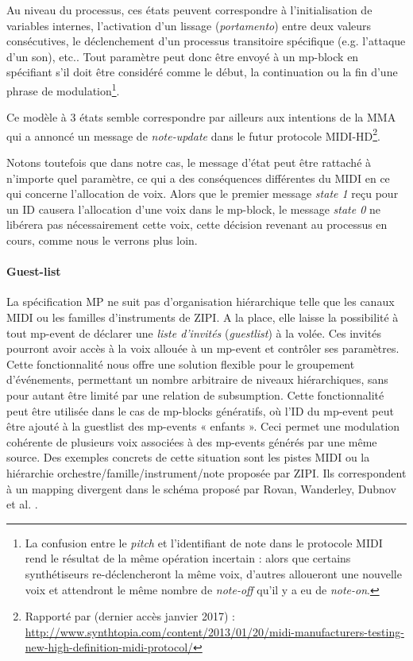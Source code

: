 Au niveau du processus, ces états peuvent correspondre à l'initialisation de variables internes, l'activation d'un lissage (\textit{portamento}) entre deux valeurs consécutives, le déclenchement d'un processus transitoire spécifique (e.g. l'attaque d'un son), etc.. Tout paramètre peut donc être envoyé à un mp-block en spécifiant s'il doit être considéré comme le début, la continuation ou la fin d'une phrase de modulation\footnote{ La confusion entre le \textit{pitch} et l'identifiant de note dans le protocole \gls{MIDI} rend le résultat de la même opération incertain : alors que certains synthétiseurs re-déclencheront la même voix, d'autres alloueront une nouvelle voix et attendront le même nombre de \textit{note-off} qu'il y a eu de \textit{note-on}.}.

Ce modèle à 3 états semble correspondre par ailleurs aux intentions de la MMA qui a annoncé un message de \textit{note-update} dans le futur protocole MIDI-HD\footnote{ Rapporté par (dernier accès janvier 2017) : \url{http://www.synthtopia.com/content/2013/01/20/midi-manufacturers-testing-new-high-definition-midi-protocol/}}.

Notons toutefois que dans notre cas, le message d'état peut être rattaché à n'importe quel paramètre, ce qui a des conséquences différentes du \gls{MIDI} en ce qui concerne l'allocation de voix. Alors que le premier message \textit{state 1} reçu pour un ID causera l'allocation d'une voix dans le mp-block, le message \textit{state 0} ne libérera pas nécessairement cette voix, cette décision revenant au processus en cours, comme nous le verrons plus loin.

\paragraph{Guest-list}
La spécification MP ne suit pas d'organisation hiérarchique telle que les canaux \gls{MIDI} ou les familles d'instruments de ZIPI. A la place, elle laisse la possibilité à tout mp-event de déclarer une \textit{liste d'invités} (\textit{guestlist}) à la volée. Ces invités pourront avoir accès à la voix allouée à un mp-event et contrôler ses paramètres. Cette fonctionnalité nous offre une solution flexible pour le groupement d'événements, permettant un nombre arbitraire de niveaux hiérarchiques, sans pour autant être limité par une relation de subsumption.
Cette fonctionnalité peut être utilisée dans le cas de mp-blocks génératifs, où l'ID du mp-event peut être ajouté à la guestlist des mp-events « enfants ». Ceci permet une modulation cohérente de plusieurs voix associées à des mp-events générés par une même source. Des exemples concrets de cette situation sont les pistes \gls{MIDI} ou la hiérarchie orchestre/famille/instrument/note proposée par ZIPI. Ils correspondent à un mapping divergent dans le schéma proposé par Rovan, Wanderley, Dubnov et al. \cite{rovan_instrumental_1997}.

